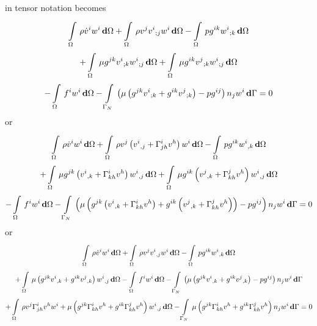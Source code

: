  in tensor notation becomes
\begin{multline}
  \gint{\Omega}{}{\rho\dot{v}^{i}w^{i}}{\Omega}
 +\gint{\Omega}{}{\rho v^{j}\covarderiv{v^{i}}{j}w^{i}}{\Omega}
 -\gint{\Omega}{}{pg^{ik}\covarderiv{w^{i}}{k}}{\Omega}\\
 +\gint{\Omega}{}{{\mu}g^{jk}\covarderiv{v^{i}}{k}\covarderiv{w^{i}}{j}}{\Omega}
 +\gint{\Omega}{}{{\mu}g^{ik}\covarderiv{v^{j}}{k}\covarderiv{w^{i}}{j}}{\Omega}\\
 -\gint{\Omega}{}{f^{i}w^{i}}{\Omega}
 -\gint{\Gamma_N}{}{\pbrac{\mu\pbrac{g^{jk}\covarderiv{v^{i}}{k}+g^{ik}\covarderiv{v^{j}}{k}}-pg^{ij}}n_{j}w^{i}}{\Gamma}=0
 \label{eqn:TensorNSE}
\end{multline}
or
\begin{multline}
  \gint{\Omega}{}{\rho\dot{v}^{i}w^{i}}{\Omega}
 +\gint{\Omega}{}{\rho v^{j}\pbrac{\partialderiv{v^{i}}{j}+\christoffel{i}{j}{h}v^{h}}w^{i}}{\Omega}
 -\gint{\Omega}{}{pg^{ik}\partialderiv{w^{i}}{k}}{\Omega}\\
 +\gint{\Omega}{}{{\mu}g^{jk}\pbrac{\partialderiv{v^{i}}{k}+\christoffel{i}{k}{h}v^{h}}\partialderiv{w^{i}}{j}}{\Omega}
 +\gint{\Omega}{}{{\mu}g^{ik}\pbrac{\partialderiv{v^{j}}{k}+\christoffel{j}{k}{h}v^{h}}\partialderiv{w^{i}}{j}}{\Omega}\\
 -\gint{\Omega}{}{f^{i}w^{i}}{\Omega}
 -\gint{\Gamma_N}{}{\pbrac{\mu\pbrac{g^{jk}\pbrac{\partialderiv{v^{i}}{k}+\christoffel{i}{k}{h}v^{h}}+g^{ik}\pbrac{\partialderiv{v^{j}}{k}+\christoffel{j}{k}{h}v^{h}}}-pg^{ij}}n_{j}w^{i}}{\Gamma}=0
 \label{eqn:Tensor2NSE}
\end{multline}
or
\begin{multline}
  \gint{\Omega}{}{\rho\dot{v}^{i}w^{i}}{\Omega}
 +\gint{\Omega}{}{\rho v^{j}\partialderiv{v^{i}}{j}w^{i}}{\Omega}
 -\gint{\Omega}{}{pg^{ik}\partialderiv{w^{i}}{k}}{\Omega}\\
 +\gint{\Omega}{}{\mu\pbrac{g^{jk}\partialderiv{v^{i}}{k}+g^{ik}\partialderiv{v^{j}}{k}}\partialderiv{w^{i}}{j}}{\Omega}
 -\gint{\Omega}{}{f^{i}w^{i}}{\Omega}
 -\gint{\Gamma_N}{}{\pbrac{\mu\pbrac{g^{jk}\partialderiv{v^{i}}{k}+g^{ik}\partialderiv{v^{j}}{k}}-pg^{ij}}n_{j}w^{i}}{\Gamma}\\
 +\gint{\Omega}{}{\rho v^{j}\christoffel{i}{j}{h}v^{h}w^{i}+\mu\pbrac{g^{jk}\christoffel{i}{k}{h}v^{h}+
     g^{ik}\christoffel{j}{k}{h}v^{h}}\partialderiv{w^{i}}{j}}{\Omega}
 -\gint{\Gamma_N}{}{\mu\pbrac{g^{jk}\christoffel{i}{k}{h}v^{h}+g^{ik}\christoffel{j}{k}{h}v^{h}}n_{j}w^{i}}{\Gamma}=0
 \label{eqn:Tensor3NSE}
\end{multline}

